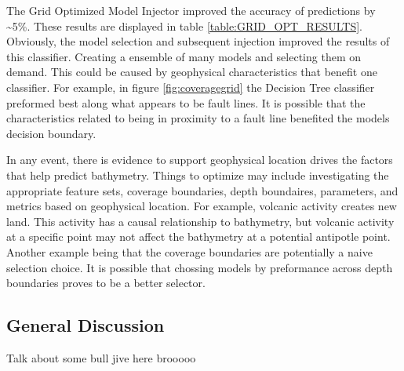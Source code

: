 \par
The Grid Optimized Model Injector improved the accuracy of predictions by \~{}5\%.
These results are displayed in table \ref{table:GRID_OPT_RESULTS}.
Obviously, the model selection and subsequent injection improved the results of this classifier.
Creating a ensemble of many models and selecting them on demand.
This could be caused by geophysical characteristics that benefit one classifier.
For example, in figure \ref{fig:coveragegrid} the Decision Tree classifier preformed best along what appears to be fault lines.
It is possible that the characteristics related to being in proximity to a fault line benefited the models decision boundary. 


\par
In any event, there is evidence to support geophysical location drives the factors that help predict bathymetry.
Things to optimize may include investigating the appropriate feature sets, coverage boundaries, depth boundaires, parameters, and metrics based on geophysical location.
For example, volcanic activity creates new land.
This activity has a causal relationship to bathymetry, but volcanic activity at a specific point may not affect the bathymetry at a potential antipotle point.
Another example being that the coverage boundaries are potentially a naive selection choice.
It is possible that chossing models by preformance across depth boundaries proves to be a better selector.


\subsection{General Discussion}
Talk about some bull jive here brooooo